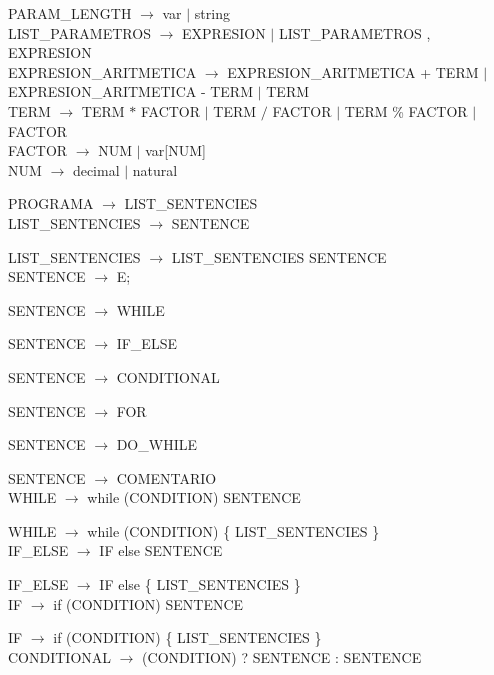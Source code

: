 \documentclass[10pt,a4paper]{article}
\begin{document}
PARAM\_LENGTH $\rightarrow$ var $|$ string \\

LIST\_PARAMETROS $\rightarrow$ EXPRESION $|$ LIST\_PARAMETROS , EXPRESION \\

EXPRESION\_ARITMETICA $\rightarrow$ EXPRESION\_ARITMETICA + TERM $|$ EXPRESION\_ARITMETICA - TERM $|$ TERM \\

TERM $\rightarrow$ TERM $*$ FACTOR $|$ TERM $/$ FACTOR $|$ TERM \% FACTOR $|$ FACTOR \\

FACTOR $\rightarrow$ NUM $|$ var[NUM] \\

NUM $\rightarrow$ decimal $|$ natural

\newpage

PROGRAMA $\rightarrow$ LIST\_SENTENCIES \\

LIST\_SENTENCIES $\rightarrow$ SENTENCE 

LIST\_SENTENCIES $\rightarrow$ LIST\_SENTENCIES SENTENCE \\

SENTENCE $\rightarrow$  E; 

SENTENCE $\rightarrow$  WHILE  

SENTENCE $\rightarrow$  IF\_ELSE  

SENTENCE $\rightarrow$  CONDITIONAL  

SENTENCE $\rightarrow$  FOR 

SENTENCE $\rightarrow$  DO\_WHILE   

SENTENCE $\rightarrow$  COMENTARIO \\ 


WHILE $\rightarrow$ while (CONDITION) SENTENCE  

WHILE $\rightarrow$ while (CONDITION) \{ LIST\_SENTENCIES \} \\

IF\_ELSE $\rightarrow$ IF else SENTENCE  

IF\_ELSE $\rightarrow$ IF else \{ LIST\_SENTENCIES \} \\

IF $\rightarrow$ if (CONDITION) SENTENCE   

IF $\rightarrow$ if (CONDITION) \{ LIST\_SENTENCIES \} \\

CONDITIONAL $\rightarrow$ (CONDITION) ? SENTENCE : SENTENCE \\
\end{document}
